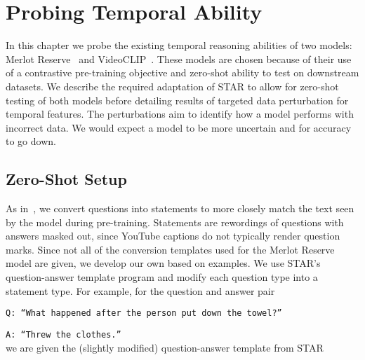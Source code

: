 
\chapter{Probing Temporal Ability}
\label{chap:probe}


In this chapter we probe the existing temporal reasoning abilities of two
models: Merlot Reserve~\citep{zellers2022mreserve} and
VideoCLIP~\citep{xu2021videoclip}.  These models are chosen because of their
use of a contrastive pre-training objective and zero-shot ability to test on
downstream datasets. We describe the required adaptation of STAR to allow for
zero-shot testing of both models before detailing results of targeted data
perturbation for temporal features. The perturbations aim to identify how a
model performs with incorrect data. We would expect a model to be more
uncertain and for accuracy to go down.

\section{Zero-Shot Setup}
\label{sec:mres_zs}

As in~\citet{zellers2022mreserve}, we convert questions into statements to more
closely match the text seen by the model during pre-training. Statements are
rewordings of questions with answers masked out, since YouTube captions do not 
typically render question marks. Since not all of the conversion templates used
for the Merlot Reserve model are given, we develop our own based on examples. 
We use STAR's question-answer template program and modify each question type
into a statement type. For example, for the question and answer pair

\texttt{Q: ``What happened after the person put down the towel?''}

\texttt{A: ``Threw the clothes.''}\\
we are given the (slightly modified) question-answer template from STAR

